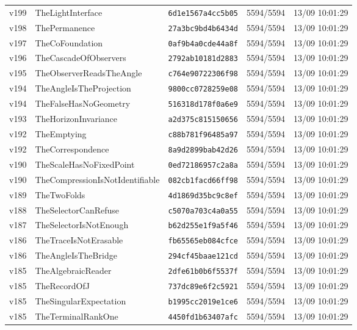 \documentclass[11pt]{article}
\theoremstyle{definition}\newtheorem{deriv}{Derivação}
\begin{document}
{\begin{longtable}{@{}lllll@{}}
v199 & TheLightInterface & \texttt{6d1e1567a4cc5b05} & 5594/5594 & 13/09 10:01:29 \\
v198 & ThePermanence & \texttt{27a3bc9bd4b6434d} & 5594/5594 & 13/09 10:01:29 \\
v197 & TheCoFoundation & \texttt{0af9b4a0cde44a8f} & 5594/5594 & 13/09 10:01:29 \\
v196 & TheCascadeOfObservers & \texttt{2792ab10181d2883} & 5594/5594 & 13/09 10:01:29 \\
v195 & TheObserverReadsTheAngle & \texttt{c764e90722306f98} & 5594/5594 & 13/09 10:01:29 \\
v194 & TheAngleIsTheProjection & \texttt{9800cc0728259e08} & 5594/5594 & 13/09 10:01:29 \\
v194 & TheFalseHasNoGeometry & \texttt{516318d178f0a6e9} & 5594/5594 & 13/09 10:01:29 \\
v193 & TheHorizonInvariance & \texttt{a2d375c815150656} & 5594/5594 & 13/09 10:01:29 \\
v192 & TheEmptying & \texttt{c88b781f96485a97} & 5594/5594 & 13/09 10:01:29 \\
v192 & TheCorrespondence & \texttt{8a9d2899bab42d26} & 5594/5594 & 13/09 10:01:29 \\
v190 & TheScaleHasNoFixedPoint & \texttt{0ed72186957c2a8a} & 5594/5594 & 13/09 10:01:29 \\
v190 & TheCompressionIsNotIdentifiable & \texttt{082cb1facd66ff98} & 5594/5594 & 13/09 10:01:29 \\
v189 & TheTwoFolds & \texttt{4d1869d35bc9c8ef} & 5594/5594 & 13/09 10:01:29 \\
v188 & TheSelectorCanRefuse & \texttt{c5070a703c4a0a55} & 5594/5594 & 13/09 10:01:29 \\
v187 & TheSelectorIsNotEnough & \texttt{b62d255e1f9a5f46} & 5594/5594 & 13/09 10:01:29 \\
v186 & TheTraceIsNotErasable & \texttt{fb65565eb084cfce} & 5594/5594 & 13/09 10:01:29 \\
v186 & TheAngleIsTheBridge & \texttt{294cf45baae121cd} & 5594/5594 & 13/09 10:01:29 \\
v185 & TheAlgebraicReader & \texttt{2dfe61b0b6f5537f} & 5594/5594 & 13/09 10:01:29 \\
v185 & TheRecordOfJ & \texttt{737dc89e6f2c5921} & 5594/5594 & 13/09 10:01:29 \\
v185 & TheSingularExpectation & \texttt{b1995cc2019e1ce6} & 5594/5594 & 13/09 10:01:29 \\
v185 & TheTerminalRankOne & \texttt{4450fd1b63407afc} & 5594/5594 & 13/09 10:01:29 \\

\end{longtable}}
\end{document}
